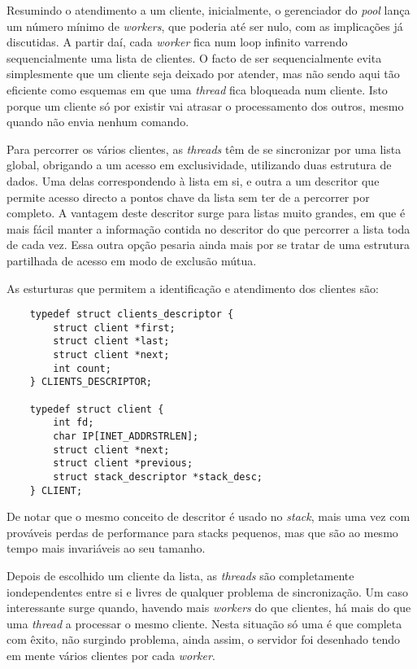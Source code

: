 	\setlength{\parskip}{20pt}		%

	Resumindo o atendimento a um cliente, inicialmente, o gerenciador do \emph{pool} lança um número mínimo de \emph{workers}, que poderia até ser nulo, com as implicações já discutidas.
	A partir daí, cada \emph{worker} fica num loop infinito varrendo sequencialmente uma lista de clientes.
	O facto de ser sequencialmente evita simplesmente que um cliente seja deixado por atender, mas não sendo aqui tão eficiente como esquemas em que uma \emph{thread} fica bloqueada num cliente.
	Isto porque um cliente só por existir vai atrasar o processamento dos outros, mesmo quando não envia nenhum comando.
	
	\setlength{\parskip}{5pt}		%

	Para percorrer os vários clientes, as \emph{threads} têm de se sincronizar por uma lista global, obrigando a um acesso em exclusividade, utilizando duas estrutura de dados.
	Uma delas correspondendo à lista em si, e outra a um descritor que permite acesso directo a pontos chave da lista sem ter de a percorrer por completo.
	A vantagem deste descritor surge para listas muito grandes, em que é mais fácil manter a informação contida no descritor do que percorrer a lista toda de cada vez.
	Essa outra opção pesaria ainda mais por se tratar de uma estrutura partilhada de acesso em modo de exclusão mútua.

	As esturturas que permitem a identificação e atendimento dos clientes são:
	
	\begin{lstlisting}
	typedef struct clients_descriptor {
		struct client *first;
		struct client *last;
		struct client *next;
		int count;
	} CLIENTS_DESCRIPTOR;

	typedef struct client {
		int fd;
		char IP[INET_ADDRSTRLEN];
		struct client *next;
		struct client *previous;
		struct stack_descriptor *stack_desc;
	} CLIENT;
	\end{lstlisting}
	
	De notar que o mesmo conceito de descritor é usado no \emph{stack}, mais uma vez com prováveis perdas de performance para stacks pequenos, mas que são ao mesmo tempo mais invariáveis ao seu tamanho.

	Depois de escolhido um cliente da lista, as \emph{threads} são completamente iondependentes entre si e livres de qualquer problema de sincronização.
	Um caso interessante surge quando, havendo mais \emph{workers} do que clientes, há mais do que uma \emph{thread} a processar o mesmo cliente.
	Nesta situação só uma é que completa com êxito, não surgindo problema, ainda assim, o servidor foi desenhado tendo em mente vários clientes por cada \emph{worker}.
	
